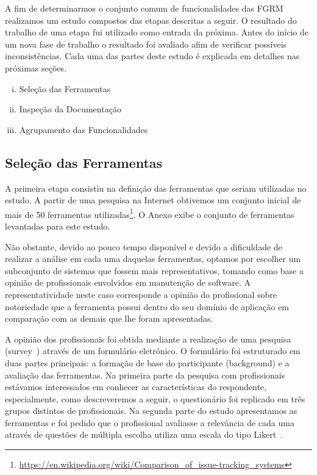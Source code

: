 A fim de determinarmos o conjunto comum de funcionalidades das FGRM realizamos
um estudo compostos das etapas descritas a seguir. O resultado do trabalho de
uma etapa fui utilizado como entrada da próxima. Antes do início de um nova fase
de trabalho o resultado foi avaliado afim de verificar possíveis
inconsistências. Cada uma das partes deste estudo é explicada em detalhes nas
próximas seções.

\begin{enumerate}[(i)]
	\item Seleção das Ferramentas
	\item Inspeção da Documentação
	\item Agrupamento das Funcionalidades
\end{enumerate}

\subsection{Seleção das Ferramentas}
\label{subsec:selecao-ferramentas}

A primeira etapa consistiu na definição das ferramentas que seriam utilizadas no
estudo. A partir de uma pesquisa na Internet obtivemos um conjunto inicial de
mais de 50 ferramentas
utilizadas\footnote{\url{https://en.wikipedia.org/wiki/Comparison_of_issue-tracking_systems}}.
O Anexo exibe o conjunto de ferramentas levantadas para este estudo.

Não obstante, devido ao pouco tempo disponível e devido a dificuldade de
realizar a análise em cada uma daquelas ferramentas, optamos por escolher um
subconjunto de sistemas que fossem mais representativos, tomando como base a
opinião de profissionais envolvidos em manutenção de software. A
representatividade neste caso corresponde a opinião do profissional sobre
notoriedade que a ferramenta possui dentro do seu domínio de aplicação em
comparação com as demais que lhe foram apresentadas.

A opinião dos profissionais foi obtida mediante a realização de uma pesquisa
(survey~\cite{wohlin2012experimentation}) através de um formulário eletrônico.
O formulário foi estruturado em duas partes principais: a formação de
base do participante (background) e a avaliação das ferramentas. Na primeira
parte da pesquisa com profissionais estávamos interessados em conhecer as
características do respondente, especialmente, como descreveremos a seguir, o
questionário foi replicado em três grupos distintos de profissionais. Na segunda
parte do estudo apresentamos as ferramentas e foi pedido que o profissional
avaliasse a relevância de cada uma através de questões de múltipla escolha
utiliza uma escala do tipo Likert~\cite{robbins2011plotting}.

